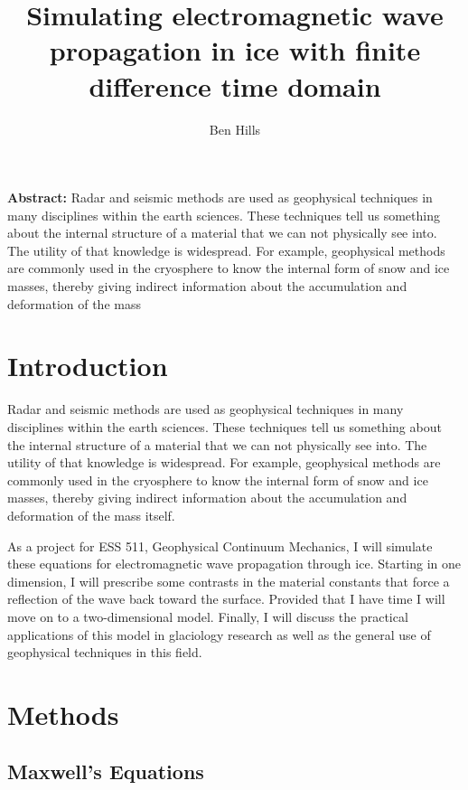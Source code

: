 \documentclass[a4paper]{article}
\begin{document}
\title{Simulating electromagnetic wave propagation in ice with finite difference time domain}
\author{Ben Hills}
\maketitle

\justify
\textbf{Abstract:} Radar and seismic methods are used as geophysical techniques in many disciplines within the earth sciences. These techniques tell us something about the internal structure of a material that we can not physically see into. The utility of that knowledge is widespread. For example, geophysical methods are commonly used in the cryosphere to know the internal form of snow and ice masses, thereby giving indirect information about the accumulation and deformation of the mass

\raggedright
\section{Introduction}
Radar and seismic methods are used as geophysical techniques in many disciplines within the earth sciences. These techniques tell us something about the internal structure of a material that we can not physically see into. The utility of that knowledge is widespread. For example, geophysical methods are commonly used in the cryosphere to know the internal form of snow and ice masses, thereby giving indirect information about the accumulation and deformation of the mass
itself. 

\par
As a project for ESS 511, Geophysical Continuum Mechanics, I will simulate these equations for electromagnetic wave propagation through ice. Starting in one dimension, I will prescribe some contrasts in the material constants that force a reflection of the wave back toward the surface. Provided that I have time I will move on to a two-dimensional model. Finally, I will discuss the practical applications of this model in glaciology research \cite{Christianson2016} as well as the general use of geophysical techniques in this field.

\section{Methods}

\subsection{Maxwell's Equations}
\end{document}
